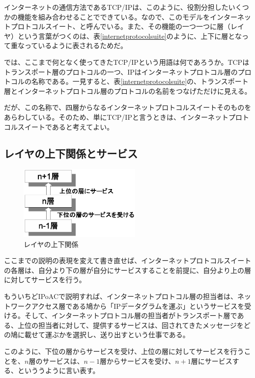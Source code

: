 インターネットの通信方法であるTCP/IPは、このように、役割分担したいくつかの機能を組み合わせることでできている。なので、このモデルをインターネットプロトコルスイート、と呼んでいる。また、その機能の一つ一つに層（レイヤ）という言葉がつくのは、表\ref{internetprotocolsuite}のように、上下に層となって重なっているように表されるためだ。


では、ここまで何となく使ってきたTCP/IPという用語は何であろうか。TCPはトランスポート層のプロトコルの一つ、IPはインターネットプロトコル層のプロトコルの名称である。一見すると、表\ref{internetprotocolsuite}の、トランスポート層とインターネットプロトコル層のプロトコルの名前をつなげただけに見える。

だが、この名称で、四層からなるインターネットプロトコルスイートそのものをあらわしている。そのため、単にTCP/IPと言うときは、インターネットプロトコルスイートであると考えてよい。

\subsection{レイヤの上下関係とサービス}

\begin{figure}
	\includegraphics[width=6cm, clip]{draw/service.eps}
	\caption{レイヤの上下関係}
	\label{fig:service}
\end{figure}

ここまでの説明の表現を変えて書き直せば、インターネットプロトコルスイートの各層は、自分より下の層が自分にサービスすることを前提に、自分より上の層に対してサービスを行う。

もういちどIPoACで説明すれば、インターネットプロトコル層の担当者は、ネットワークアクセス層である鳩から「IPデータグラムを運ぶ」というサービスを受ける。そして、インターネットプロトコル層の担当者がトランスポート層である、上位の担当者に対して、提供するサービスは、回されてきたメッセージをどの鳩に載せて運ぶかを選択し、送り出すという仕事である。

このように、下位の層からサービスを受け、上位の層に対してサービスを行うことを、$n$層のサービスは、$n-1$層からサービスを受け、$n+1$層にサービスする、といううように言い表す。

